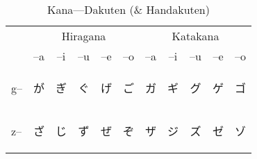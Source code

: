 \begin{table}[H]
\begin{tabular}{l|cccccc|cccccc}
		\bottomrule
	\end{tabular}
\end{table}


\begin{table}[H]
	\centering
	\label{t2}
	\caption{Kana---Dakuten (\& Handakuten) }
	\begin{tabular}{l|ccccc|ccccc}
		\toprule
          & \multicolumn{5}{c|}{Hiragana} & \multicolumn{5}{c}{Katakana} \\
	      & --a & --i & --u & --e & --o & --a & --i & --u & --e & --o \\
        \midrule
        g-- & {\begin{CJK}{UTF8}{min} が \end{CJK}} & {\begin{CJK}{UTF8}{min} ぎ \end{CJK}} & {\begin{CJK}{UTF8}{min} ぐ \end{CJK}} & {\begin{CJK}{UTF8}{min} げ \end{CJK}} & {\begin{CJK}{UTF8}{min} ご \end{CJK}} & {\begin{CJK}{UTF8}{min} ガ \end{CJK}} & {\begin{CJK}{UTF8}{min} ギ \end{CJK}} & {\begin{CJK}{UTF8}{min} グ \end{CJK}} & {\begin{CJK}{UTF8}{min} ゲ \end{CJK}} & {\begin{CJK}{UTF8}{min} ゴ \end{CJK}} \\
        z-- & {\begin{CJK}{UTF8}{min} ざ \end{CJK}} & {\begin{CJK}{UTF8}{min} じ \end{CJK}} & {\begin{CJK}{UTF8}{min} ず \end{CJK}} & {\begin{CJK}{UTF8}{min} ぜ \end{CJK}} & {\begin{CJK}{UTF8}{min} ぞ \end{CJK}} & {\begin{CJK}{UTF8}{min} ザ \end{CJK}} & {\begin{CJK}{UTF8}{min} ジ \end{CJK}} & {\begin{CJK}{UTF8}{min} ズ \end{CJK}} & {\begin{CJK}{UTF8}{min} ゼ \end{CJK}} & {\begin{CJK}{UTF8}{min} ゾ \end{CJK}} \\

\end{tabular}
\end{table}
